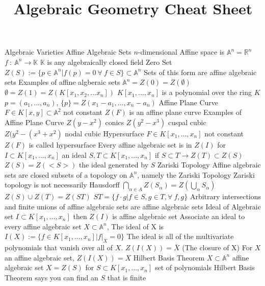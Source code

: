 \documentclass[14pt]{extarticle}
\title{Algebraic Geometry Cheat Sheet}
\begin{document}
	\maketitle
	\begin{outline}
		\1	Algebraic Varieties
			\2	Affine Algebraic Sets
				\3	$n$-dimensional Affine space is $\mathbb{A}^n = \mathbb{R}^n$
				\3	$f~:~\mathbb{A}^n \rightarrow \mathbb{K}$
					\4	$\mathbb{K}$ is any algebraically closed field
				\3	Zero Set $Z(S) := \{p \in \mathbb{A}^n | f(p) = 0~\forall~f \in S\} \subset \mathbb{A}^n$
					\4	Sets of this form are affine algebraic sets
				\3	Examples of affine algberaic sets
					\4	$\mathbb{A}^n = Z(0) = Z(\emptyset)$
					\4	$\emptyset = Z(1) = Z(K[x_1,x_2,...x_n])$
					\4	$K[x_1,...,x_n]$ is a polynomial over the ring $K$
					\4	$p = (a_1,...,a_n)$, $\{p\} = Z(x_1 - a_1,...,x_n-a_n)$
				\3	Affine Plane Curve
					\4	$F \in K[x,y] \subset \mathbb{A}^2$ not constant
					\4	$Z(F)$ is an affine plane curve
				\3	Examples of Affine Plane Curve
					\4	$Z(y - x^2)$ conics
					\4	$Z(y^2 - x^3)$ cuspal cubic
					\4	$Z(y^2 - (x^3 + x^2)$ nodal cubic
				\3	Hypersurface
					\4	$F \in K[x_1,...,x_n]$ not constant
					\4	$Z(F)$ is called hypersurface
				\3	Every affine algebraic set is in $Z(I)$ for $I \subset K[x_1,...,x_n]$ an ideal
					\4	$S,T \subset K[x_1,...,x_n]$ if $S \subset T \rightarrow Z(T) \subset Z(S)$
					\4	$Z(S) = Z(<S>)$ the ideal generated by $S$
			\2	Zariski Topology
				\3	Affine algebraic sets are closed subsets of a topology on $\mathbb{A}^n$, namely the Zariski Topology
				\3	Zariski topology is not necessarily Hausdorff 
				\3	$\bigcap_{\alpha \in A} Z(S_{\alpha}) = Z(\bigcup_{\alpha}S_{\alpha})$
				\3	$Z(S) \cup Z(T) = Z(ST)$
					\4	$ST = \{f \cdot g | f \in S, g \in T, \forall~f,g \}$
				\3	Arbitrary intersections and finite unions of affine algebraic sets
						are affine algebraic sets
			\2	Ideal of Algebraic set
				\3	$I \subset K[x_1,...,x_n]$ then $Z(I)$ is affine algebraic set
				\3	Associate an ideal to every affine algebraic set
				\3	$X \subset \mathbb{A}^n$, The ideal of X is
						$I(X) := \{f \in K[x_1,...,x_n] | f|_X = 0\}$
						\4	The ideal is all of the multivariate polynomials that vanish
								over all of $X$.
				\3	$Z(I(X)) = \bar{X}$ (The closure of X)
					\4	For $X$ an affine algebraic set, $Z(I(X)) = X$
			\2	Hilbert Basis Theorem
				\3	$X \subset \mathbb{A}^n$ affine algebraic set
				\3	$X = Z(S)$ for $S \subset K[x_1,...,x_n]$ set of polynomials
				\3	Hilbert Basis Theorem says you can find an $S$ that is finite
	\end{outline}
\end{document}

